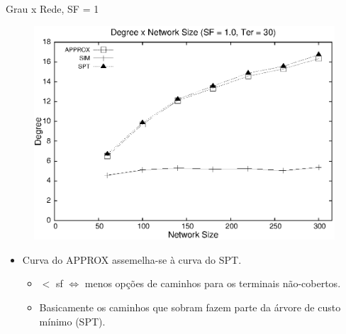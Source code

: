 \documentclass[10pt]{beamer}
\begin{document}
\begin{frame}{Grau x Rede, SF = 1}
\begin{figure}[H]
\centering
\includegraphics[scale=0.60]{imagens/defesa-grau_rede_sf1}
\label{fig:grau_rede_sf1}
\end{figure}
\begin{itemize}
  \item Curva do APPROX assemelha-se à curva do SPT.
  \begin{itemize}
    \item $<$ sf $\Leftrightarrow$ menos opções de caminhos para os terminais não-cobertos.
    \item Basicamente os caminhos que sobram fazem parte da árvore de custo mínimo (SPT).
  \end{itemize}
\end{itemize}
\end{frame}
\end{document}
